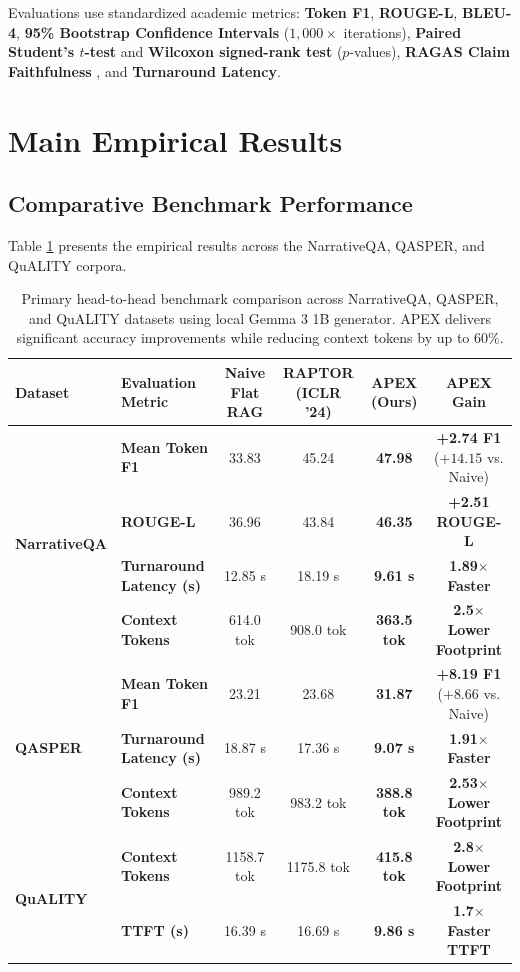 \documentclass[11pt,a4paper]{article}
\begin{document}
Evaluations use standardized academic metrics: \textbf{Token F1}, \textbf{ROUGE-L}, \textbf{BLEU-4}, \textbf{95\% Bootstrap Confidence Intervals} ($1,000\times$ iterations), \textbf{Paired Student's $t$-test} and \textbf{Wilcoxon signed-rank test} ($p$-values), \textbf{RAGAS Claim Faithfulness} \cite{es2024ragas}, and \textbf{Turnaround Latency}.

\section{Main Empirical Results}
\label{sec:results}

\subsection{Comparative Benchmark Performance}
Table \ref{tab:main_benchmark} presents the empirical results across the NarrativeQA, QASPER, and QuALITY corpora.

\begin{table}[t]
\centering
\small
\begin{tabular}{ll c c c c}
\toprule
\textbf{Dataset} & \textbf{Evaluation Metric} & \textbf{Naive Flat RAG} & \textbf{RAPTOR (ICLR '24)} & \textbf{APEX (Ours)} & \textbf{APEX Gain} \\
\midrule
\multirow{4}{*}{\textbf{NarrativeQA}} & \textbf{Mean Token F1} & 33.83 & 45.24 & \textbf{47.98} & \textbf{+2.74 F1} ($+14.15$ vs. Naive) \\
 & \textbf{ROUGE-L} & 36.96 & 43.84 & \textbf{46.35} & \textbf{+2.51 ROUGE-L} \\
 & \textbf{Turnaround Latency (s)} & 12.85 s & 18.19 s & \textbf{9.61 s} & \textbf{1.89$\times$ Faster} \\
 & \textbf{Context Tokens} & 614.0 tok & 908.0 tok & \textbf{363.5 tok} & \textbf{2.5$\times$ Lower Footprint} \\
\midrule
\multirow{3}{*}{\textbf{QASPER}} & \textbf{Mean Token F1} & 23.21 & 23.68 & \textbf{31.87} & \textbf{+8.19 F1} ($+8.66$ vs. Naive) \\
 & \textbf{Turnaround Latency (s)} & 18.87 s & 17.36 s & \textbf{9.07 s} & \textbf{1.91$\times$ Faster} \\
 & \textbf{Context Tokens} & 989.2 tok & 983.2 tok & \textbf{388.8 tok} & \textbf{2.53$\times$ Lower Footprint} \\
\midrule
\multirow{2}{*}{\textbf{QuALITY}} & \textbf{Context Tokens} & 1158.7 tok & 1175.8 tok & \textbf{415.8 tok} & \textbf{2.8$\times$ Lower Footprint} \\
 & \textbf{TTFT (s)} & 16.39 s & 16.69 s & \textbf{9.86 s} & \textbf{1.7$\times$ Faster TTFT} \\
\bottomrule
\end{tabular}
\caption{Primary head-to-head benchmark comparison across NarrativeQA, QASPER, and QuALITY datasets using local Gemma 3 1B generator. APEX delivers significant accuracy improvements while reducing context tokens by up to $60\%$.}
\label{tab:main_benchmark}
\end{table}
\end{document}
